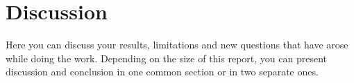 \section{Discussion}
\label{section:disc}
Here you can discuss your results, limitations and new questions that have arose while doing the work. Depending on the size of this report, you can present discussion and conclusion in one common section or in two separate ones. 
